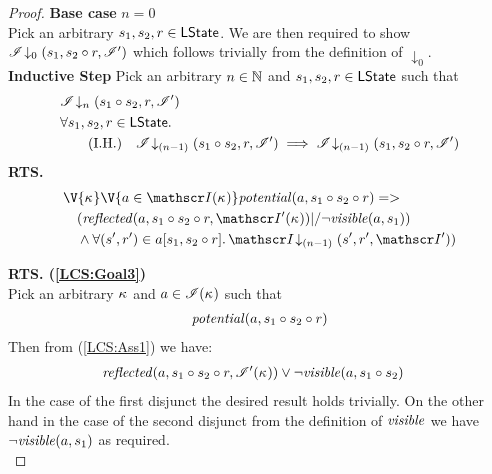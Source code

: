 \begin{lemma}
\begin{proof}
\noindent\textbf{Base case }$n=0$\\
Pick an arbitrary $s_1, s_2, r \in \textsf{LState}$. We are then required to show	$\mathscr{I} \!\downarrow_{0} \left(s_1, s_2 \circ r, \mathscr{I}'\right) $ which follows trivially from the definition of $\downarrow_0$.\\

\noindent\textbf{Inductive Step} Pick an arbitrary $n \in \mathbb{N}$ and $s_1, s_2, r \in \textsf{LState}$ such that
%
\begin{align}
	& \extendsAMUpto{\lmod}{n}{s_1 \composeL s_2}{r}{\lmod'} \label{LCS:Ass1}\\
%
	&	\for{s_1, s_2, r \in \LStates} \nonumber \\	
	& \tag{I.H.} \quad\extendsAMUpto{\lmod}{(n-1)}{s_1 \composeL s_2}{r}{\lmod'} \implies 
										\extendsAMUpto{\lmod}{(n-1)}{s_1}{s_2 \composeL r}{\lmod'} \label{LCS:IH}
\end{align}
%
\textbf{RTS. }
%
\begin{align}
  &\V{\ca{}}\V{a\in \lmod(\ca{})}
  \m{potential}(a,s_1 \composeL s_2 \composeL r) =>\null \nonumber \\
  &\quad 
		(\m{reflected}(a,s_1 \composeL s_2 \composeL r,\lmod'(\ca{})) 
		|/ \neg\m{visible}(a,s_1)) 	 \label{LCS:Goal3} \\
%  
	& \quad\land  \for{(s', r') \in a[s_1, s_2 \composeL r]} \extendsAMUpto{\lmod}{(n-1)}{s'}{r'}{\lmod'}) \label{LCS:Goal4}
%
\end{align}
%
%
%
%
%

\noindent\textbf{RTS. (\ref{LCS:Goal3})}\\
Pick an arbitrary $\kappa_{}$ and $a \in \mathscr{I}(\kappa_{})$ such that 
\begin{align*}
	\mathit{potential}(a, s_1 \circ s_2 \circ r)
\end{align*}
Then from (\ref{LCS:Ass1}) we have: 
%
\begin{align*}
	& \mathit{reflected}(a,s_1 \circ s_2 \circ r,\mathscr{I}'(\kappa_{})) 
	\lor \neg\mathit{visible}(a,s_1 \circ s_2) 
\end{align*}
%
In the case of the first disjunct the desired result holds trivially. On the other hand in the case of the second disjunct from the definition of $\mathit{visible}$ we have $\neg\mathit{visible}(a, s_1)$ as required.\\


\end{proof}
\end{lemma}
